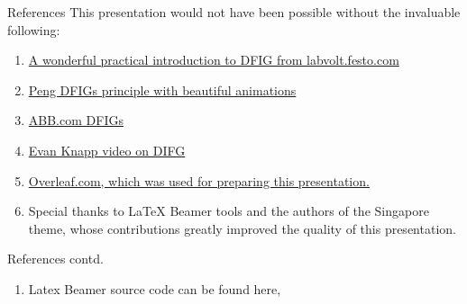 \documentclass{beamer}
\begin{document}
\begin{frame}{References}
    This presentation would not have been possible without the invaluable following:
    \vspace{0.1in}
    \begin{enumerate}
        \item \href{https://web.archive.org/web/20230526092355/https://labvolt.festo.com/downloads/86376_F0.pdf}{A wonderful practical introduction to DFIG from labvolt.festo.com}

      \item \href{https://www.pengky.cn/zz-horizontal-axis-turbine/13-doubly-fed-wind-turbine-principle/doubly-fed-wind-turbine-principle.html}{Peng DFIGs principle with beautiful animations}
      
        \item \href{https://new.abb.com/motors-generators/generators/generators-for-renewables/doubly-fed-generators}{ABB.com DFIGs}
        
        \item \href{https://www.youtube.com/watch?v=Fvc2I0L2vMU}{Evan Knapp video on DIFG}
        
        
        \item \href{https://www.overleaf.com}{Overleaf.com, which was used for preparing this presentation.}
        
        \item Special thanks to LaTeX Beamer tools and the authors of the Singapore theme, whose contributions greatly improved the quality of this presentation.
        \end{enumerate}
\end{frame}

\begin{frame}{References contd.}
    \begin{enumerate}
        \item Latex Beamer source code can be found here, \href{}{}
    \end{enumerate}
\end{frame}
\end{document}
